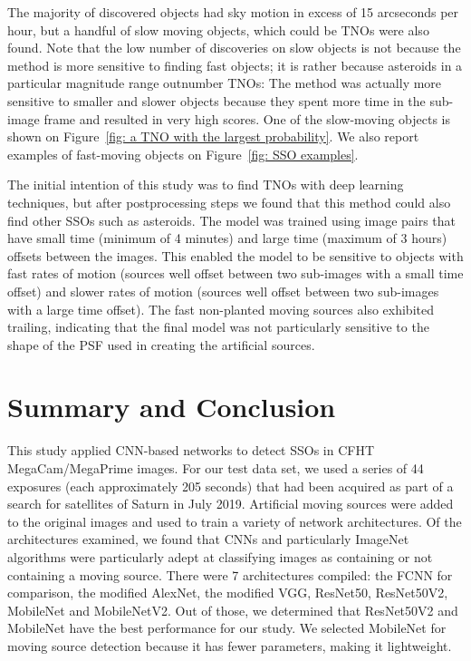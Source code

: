 \documentclass{aastex631}
\begin{document}
The majority of discovered objects had sky motion in excess of 15 arcseconds per hour, but a handful of slow moving objects, which could be TNOs were also found.
Note that the low number of discoveries on slow objects is not because the method is more sensitive to finding fast objects; it is rather because asteroids in a particular magnitude range outnumber TNOs: The method was actually more sensitive to smaller and slower objects because they spent more time in the sub-image frame and resulted in very high scores.
One of the slow-moving objects is shown on Figure~\ref{fig: a TNO with the largest probability}.
We also report examples of fast-moving objects on Figure~\ref{fig: SSO examples}.

The initial intention of this study was to find TNOs with deep learning techniques, but after postprocessing steps we found that this method could also find other SSOs such as asteroids.
The model was trained using image pairs that have small time (minimum of 4 minutes) and large time (maximum of 3 hours) offsets between the images.
This enabled the model to be sensitive to objects with fast rates of motion (sources well offset between two sub-images with a small time offset) and slower rates of motion (sources well offset between two sub-images with a large time offset).
The fast non-planted moving sources also exhibited trailing, indicating that the final model was not particularly sensitive to the shape of the PSF used in creating the artificial sources.

\section{Summary and Conclusion}
This study applied CNN-based networks to detect SSOs in CFHT MegaCam/MegaPrime images.
For our test data set, we used a series of 44 exposures (each approximately 205 seconds) that had been acquired as part of a search for satellites of Saturn in July 2019.
Artificial moving sources were added to the original images and used to train a variety of network architectures.
Of the architectures examined, we found that CNNs and particularly ImageNet algorithms were particularly adept at classifying images as containing or not containing a moving source.
There were 7 architectures compiled: the FCNN for comparison, the modified AlexNet, the modified VGG, ResNet50, ResNet50V2, MobileNet and MobileNetV2.
Out of those, we determined that ResNet50V2 and MobileNet have the best performance for our study.
We selected MobileNet for moving source detection because it has fewer parameters, making it lightweight.
\end{document}
